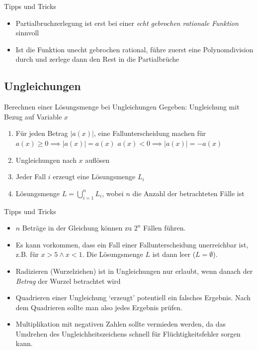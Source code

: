 \documentclass[german]{spicker}
\begin{document}
\begin{bonus}{Tipps und Tricks}
    \begin{itemize}
        \item Partialbruchzerlegung ist erst bei einer \emph{echt gebrochen rationale Funktion} sinnvoll
        \item Ist die Funktion unecht gebrochen rational, führe zuerst eine Polynomdivision durch und zerlege dann den Rest in die Partialbrüche
    \end{itemize}
\end{bonus}

\subsection{Ungleichungen}

\begin{algo}{Berechnen einer Lösungsmenge bei Ungleichungen}
    Gegeben: Ungleichung mit Bezug auf Variable $x$
    \begin{enumerate}
        \item Für jeden Betrag $\left| a(x) \right|$, eine Fallunterscheidung machen für
              \subitem $a(x) \geq 0 \implies \left| a(x) \right| = a(x)$
              \subitem $a(x) < 0 \implies \left| a(x) \right| = -a(x)$
        \item Ungleichungen nach $x$ auflösen
        \item Jeder Fall $i$ erzeugt eine Lösungsmenge $L_i$
        \item Lösungsmenge $L = \bigcup^n_{i = 1} L_i$, wobei $n$ die Anzahl der betrachteten Fälle ist
    \end{enumerate}
\end{algo}

\begin{bonus}{Tipps und Tricks}
    \begin{itemize}
        \item $n$ Beträge in der Gleichung können zu $2^n$ Fällen führen.
        \item Es kann vorkommen, dass ein Fall einer Fallunterscheidung unerreichbar ist, z.B. für $x > 5 \land x < 1$. Die Lösungsmenge $L$ ist dann leer ($L = \emptyset$).
        \item Radizieren (Wurzelziehen) ist in Ungleichungen nur erlaubt, wenn danach der \emph{Betrag} der Wurzel betrachtet wird
        \item Quadrieren einer Ungleichung `erzeugt' potentiell ein falsches Ergebnis. Nach dem Quadrieren sollte man also jedes Ergebnis prüfen.
        \item Multiplikation mit negativen Zahlen sollte vermieden werden, da das Umdrehen des Ungleichheitszeichens schnell für Flüchtigkeitsfehler sorgen kann.
    \end{itemize}
\end{bonus}
\end{document}
